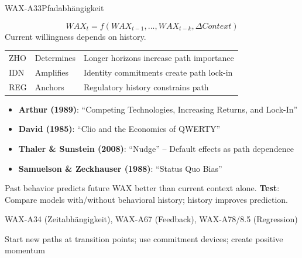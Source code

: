\begin{axiomspec}{WAX-A33}{Pfadabhängigkeit}

\begin{equation}
WAX_t = f(WAX_{t-1}, ..., WAX_{t-k}, \Delta Context)
\end{equation}
Current willingness depends on history.

\begin{tabular}{lll}
ZHO & Determines & Longer horizons increase path importance \\
IDN & Amplifies & Identity commitments create path lock-in \\
REG & Anchors & Regulatory history constrains path \\
\end{tabular}

\begin{itemize}
\item \textbf{Arthur (1989)}: ``Competing Technologies, Increasing Returns, and Lock-In''
\item \textbf{David (1985)}: ``Clio and the Economics of QWERTY''
\item \textbf{Thaler \& Sunstein (2008)}: ``Nudge'' -- Default effects as path dependence
\item \textbf{Samuelson \& Zeckhauser (1988)}: ``Status Quo Bias''
\end{itemize}

Past behavior predicts future WAX better than current context alone.
\textbf{Test}: Compare models with/without behavioral history; history improves prediction.

WAX-A34 (Zeitabhängigkeit), WAX-A67 (Feedback), WAX-A78/8.5 (Regression)

Start new paths at transition points; use commitment devices; create positive momentum

\end{axiomspec}




